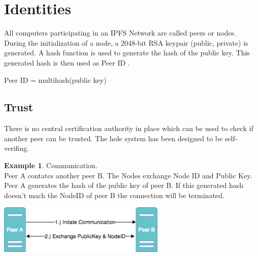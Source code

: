 \documentclass[a4paper,11pt, oneside]{report}
\theoremstyle{definition}
\newtheorem{exmp}{Example}[subsection]
\begin{document}

\newpage
\section{Identities}
All computers participating in an IPFS Network are called peers or nodes.\\
During the initialization of a node, a 2048-bit RSA keypair (public, private) is generated. A hash function is used to generate the hash of the public key. This generated hash is then used as Peer ID \cite{PeerID}.
\begin{center}
Peer ID = multihash(public key)
\end{center}

\subsection{Trust}
There is no central certification authority in place which can be used to check if another peer can be trusted. The hole system has been designed to be self-verifing.
\begin{exmp} Communication.\\
Peer A contatcs another peer B. The Nodes exchange Node ID and Public Key.
Peer A generates the hash of the public key of peer B. If this generated hash doesn't mach the NodeID of peer B the connection will be terminated.\\
\begin{center}
\includegraphics[width=0.6\textwidth]{img/ipfs_peerstrust_scenario_a.png}\\[0.8cm]
\end{center}
\end{exmp}
\end{document}
